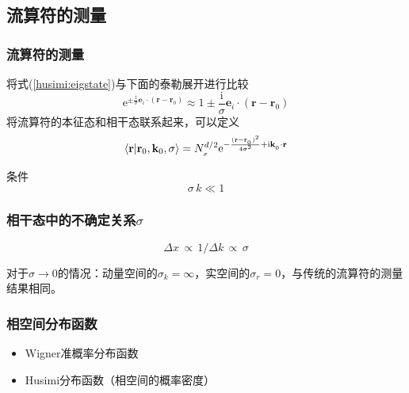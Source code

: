 \documentclass[UTF8]{beamer}
\begin{document}
\subsection{流算符的测量}
\begin{frame}
	\frametitle{流算符的测量}
	将式(\ref{husimi:eigstate})与下面的泰勒展开进行比较
	\begin{equation}
		\mathrm{e}^{\pm\frac{\mathrm{i}}{\sigma}\mathbf{e}_i\cdot(\mathbf{r}-\mathbf{r}_0)}\approx 1\pm
		\frac{\mathrm{i}}{\sigma}\mathbf{e}_i\cdot(\mathbf{r}-\mathbf{r}_0)
	\end{equation}
	将流算符的本征态和相干态联系起来，可以定义
	\begin{equation}
		\braket{\mathbf{r}|\mathbf{r}_0,\mathbf{k}_0,\sigma}=
		N_{_\sigma}^{d/2}\mathrm{e}^{-\frac{(\mathbf{r}-\mathbf{r}_{_0})^2}{4\sigma^2}+\mathrm{i}\mathbf{k}_{_0}\cdot\mathbf{r}}
	\end{equation}
	\begin{block}{条件}
		\Large
		\begin{equation*}
			\sigma\,k \ll 1
		\end{equation*}
	\end{block}
\end{frame}
\begin{frame}
	\frametitle{相干态中的不确定关系$\sigma$}
	\begin{equation}
		\Delta x \,\propto\, 1/\Delta k \,\propto\, \sigma
	\end{equation}
	\begin{block}{}
		对于$\sigma \rightarrow 0$的情况：动量空间的$\sigma_k=\infty$，实空间的$\sigma_r=0$，与传统的流算符的测量结果相同。
	\end{block}
\end{frame}
\begin{frame}
	\frametitle{相空间分布函数}
	\begin{itemize}
		\item Wigner准概率分布函数
		\item Husimi分布函数（相空间的概率密度）
	\end{itemize}
\end{frame}
\end{document}
